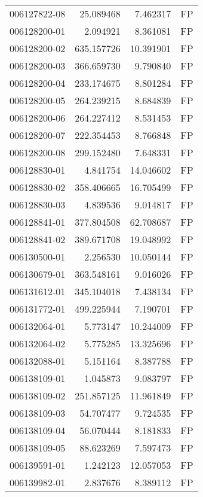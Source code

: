\begin{tabular}{lrrl}
006127822-08 &   25.089468 &       7.462317 &   FP \\
006128200-01 &    2.094921 &       8.361081 &   FP \\
006128200-02 &  635.157726 &      10.391901 &   FP \\
006128200-03 &  366.659730 &       9.790840 &   FP \\
006128200-04 &  233.174675 &       8.801284 &   FP \\
006128200-05 &  264.239215 &       8.684839 &   FP \\
006128200-06 &  264.227412 &       8.531453 &   FP \\
006128200-07 &  222.354453 &       8.766848 &   FP \\
006128200-08 &  299.152480 &       7.648331 &   FP \\
006128830-01 &    4.841754 &      14.046602 &   FP \\
006128830-02 &  358.406665 &      16.705499 &   FP \\
006128830-03 &    4.839536 &       9.014817 &   FP \\
006128841-01 &  377.804508 &      62.708687 &   FP \\
006128841-02 &  389.671708 &      19.048992 &   FP \\
006130500-01 &    2.256530 &      10.050144 &   FP \\
006130679-01 &  363.548161 &       9.016026 &   FP \\
006131612-01 &  345.104018 &       7.438134 &   FP \\
006131772-01 &  499.225944 &       7.190701 &   FP \\
006132064-01 &    5.773147 &      10.244009 &   FP \\
006132064-02 &    5.775285 &      13.325696 &   FP \\
006132088-01 &    5.151164 &       8.387788 &   FP \\
006138109-01 &    1.045873 &       9.083797 &   FP \\
006138109-02 &  251.857125 &      11.961849 &   FP \\
006138109-03 &   54.707477 &       9.724535 &   FP \\
006138109-04 &   56.070444 &       8.181833 &   FP \\
006138109-05 &   88.623269 &       7.597473 &   FP \\
006139591-01 &    1.242123 &      12.057053 &   FP \\
006139982-01 &    2.837676 &       8.389112 &   FP \\

\end{tabular}
